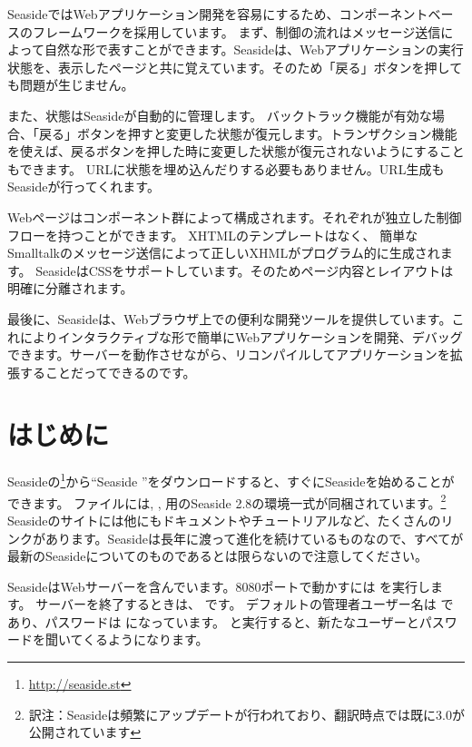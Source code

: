 \documentclass[a4paper,10pt,twoside]{book}
\begin{document}
SeasideではWebアプリケーション開発を容易にするため、コンポーネントベースのフレームワークを採用しています。
まず、制御の流れはメッセージ送信によって自然な形で表すことができます。Seasideは、Webアプリケーションの実行状態を、表示したページと共に覚えています。そのため「戻る」ボタンを押しても問題が生じません。

また、状態はSeasideが自動的に管理します。
バックトラック機能が有効な場合、「戻る」ボタンを押すと変更した状態が復元します。トランザクション機能を使えば、戻るボタンを押した時に変更した状態が復元されないようにすることもできます。
URLに状態を埋め込んだりする必要もありません。URL生成もSeasideが行ってくれます。

Webページはコンポーネント群によって構成されます。それぞれが独立した制御フローを持つことができます。
XHTMLのテンプレートはなく、 簡単なSmalltalkのメッセージ送信によって正しいXHMLがプログラム的に生成されます。
SeasideはCSSをサポートしています。そのためページ内容とレイアウトは明確に分離されます。

最後に、Seasideは、Webブラウザ上での便利な開発ツールを提供しています。これによりインタラクティブな形で簡単にWebアプリケーションを開発、デバッグできます。サーバーを動作させながら、リコンパイルしてアプリケーションを拡張することだってできるのです。
\section{はじめに}

Seasideの\footnote{\url{http://seaside.st}}から``Seaside ''をダウンロードすると、すぐにSeasideを始めることができます。
ファイルには, ,  用のSeaside 2.8の環境一式が同梱されています。\footnote{訳注：Seasideは頻繁にアップデートが行われており、翻訳時点では既に3.0が公開されています}
Seasideのサイトには他にもドキュメントやチュートリアルなど、たくさんのリンクがあります。Seasideは長年に渡って進化を続けているものなので、すべてが最新のSeasideについてのものであるとは限らないので注意してください。


SeasideはWebサーバーを含んでいます。8080ポートで動かすには   を実行します。
サーバーを終了するときは、 です。
デフォルトの管理者ユーザー名は  であり、パスワードは になっています。
   と実行すると、新たなユーザーとパスワードを聞いてくるようになります。
\end{document}
